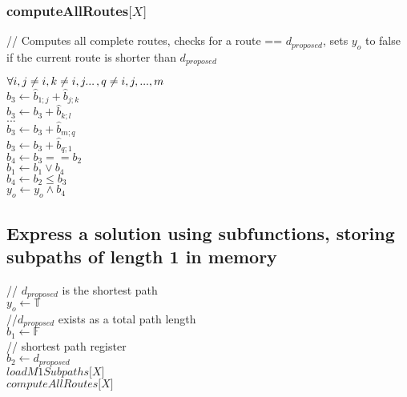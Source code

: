 \documentclass[11pt]{article}
\begin{document}
\subsubsection{computeAllRoutes$\lbrack X \rbrack$}
\vspace{1mm} // Computes all complete routes, checks for a route == $d_{proposed}$, sets $y_o$ to false if the current route is shorter than $d_{proposed}$
\begin{center}
$
\forall i,j \neq i, k \neq i,j ...\hspace{.5mm},q \neq i,j,...,m
$
\\ \vspace{2mm}
$
b_3 \leftarrow \hat{b}_{1;j}+ \hat{b}_{j;k}
$
\\ \vspace{2mm}
$
b_3 \leftarrow b_3 + \hat{b}_{k;l}
$
\\ \vspace{2mm}
$
...
$
\\ \vspace{2mm}
$
b_3 \leftarrow b_3 + \hat{b}_{m;q}
$
\\ \vspace{2mm}
$
b_3 \leftarrow b_3 + \hat{b}_{q;1}
$
\\ \vspace{2mm}
$
b_4 \leftarrow b_3 == b_2
$
\\ \vspace{2mm}
$
b_1 \leftarrow b_1 \lor b_4
$
\\ \vspace{2mm}
$
b_4 \leftarrow b_2 \leq b_3
$
\\ \vspace{2mm}
$
y_o \leftarrow y_o \land b_4
$
\end{center}




\subsection{Express a solution using subfunctions, storing subpaths of length 1 in memory}
\begin{center}
\vspace{4mm}
// $d_{proposed}$ is the shortest path\\
$y_o \leftarrow \mathbb{T}$
\\ \vspace{3mm}
//$d_{proposed}$ exists as a total path length\\
$ b_1 \leftarrow \mathbb{F}$
\\ \vspace{3mm}
// shortest path register\\
$ b_2 \leftarrow d_{proposed}$
\\ \vspace{3mm}
$loadM1Subpaths\lbrack X\rbrack$
\\ \vspace{1mm}
$computeAllRoutes\lbrack X \rbrack$
\end{center}
\end{document}
